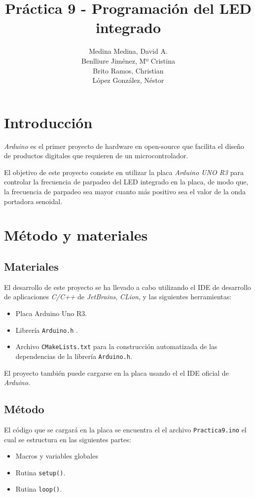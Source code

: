 \documentclass[10pt,a4paper]{report}
\author{Medina Medina, David A.\\
	Benlliure Jiménez, Mº Cristina\\
	Brito Ramos, Christian\\
	López González, Néstor\\}
\title{Práctica 9 - Programación del LED integrado}
\begin{document}
	\maketitle
	\tableofcontents
	
	\chapter{Introducción}
	\textit{Arduino} es el primer proyecto de hardware en open-source que facilita el diseño de productos digitales que requieren de un microcontrolador.
	
	El objetivo de este proyecto \cite{repositorio-github} consiste en utilizar la placa \textit{Arduino UNO R3} para controlar la frecuencia de parpadeo del LED integrado en la placa, de modo que, la frecuencia de parpadeo sea mayor cuanto más positivo sea el valor de la onda portadora senoidal.
	
	
	\chapter{Método y materiales}
	\section{Materiales}
	El desarrollo de este proyecto se ha llevado a cabo utilizando el IDE de desarrollo de aplicaciones \textit{C/C++} de \textit{JetBrains}, \textit{CLion}, y las siguientes herramientas:
	\begin{itemize}
		\item Placa Arduino Uno R3.
		\item Librería \texttt{Arduino.h} \cite{arduino-reference}.
		\item Archivo \texttt{CMakeLists.txt} para la construcción automatizada de las dependencias de la librería \texttt{Arduino.h}.
	\end{itemize}

	El proyecto también puede cargarse en la placa usando el el IDE oficial de \textit{Arduino}.  
	
	\section{Método}
	El código que se cargará en la placa se encuentra el el archivo \texttt{Practica9.ino} el cual se estructura en las siguientes partes:
	\begin{itemize}
		\item Macros y variables globales
		\item Rutina \texttt{setup()}.
		\item Rutina \texttt{loop()}.
	\end{itemize}
	
\end{document}

